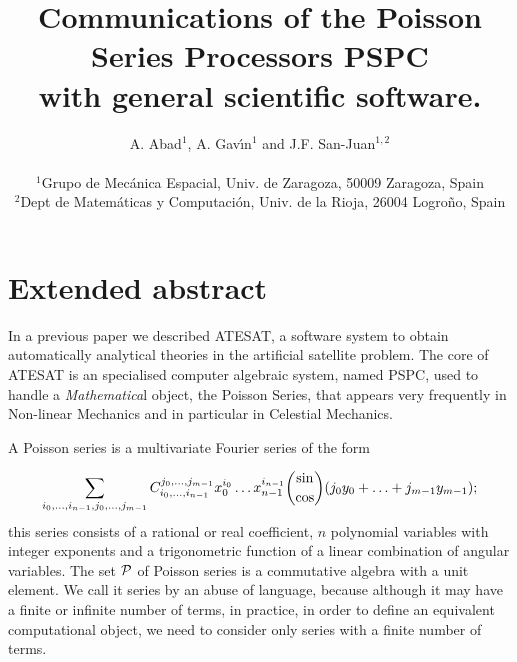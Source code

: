 %
%
\setlength{\textwidth}{14.0cm}
\setlength{\topmargin}{-1.0cm}
\setlength{\textheight}{21.0cm}

\title{\bf Communications of the Poisson Series Processors  PSPC  \\
with general scientific software. }
\author{
 A. Abad${}^1$, A. Gav\'{\i}n${}^1$ and J.F. San-Juan${}^{1,2}$ \\ [2ex] \\ 
  {\small ${}^{1}$Grupo de Mec\'anica Espacial, Univ. de Zaragoza, 50009 Zaragoza, Spain}
 \\
  {\small ${}^{2}$Dept de Matem\'aticas y Computaci\'on, Univ. de la Rioja, 26004 Logro\~no, Spain}
}
\date{}

\maketitle


\section*{Extended abstract}

In a previous paper \cite{aba98} we described ATESAT,
a software system to obtain automatically analytical theories in the artificial
satellite problem. The core of ATESAT is an specialised computer algebraic system,
named PSPC, used to handle a {\sl Mathematica}l object, the Poisson Series, that appears
very frequently in Non-linear Mechanics and in particular in Celestial Mechanics.
\par\medskip
A Poisson series is a multivariate Fourier series of the form

\[
 \sum_{i_0,\ldots,i_{n-1},j_0,\ldots,j_{m-1}}
 C_{i_0,\ldots,i_{n-1}}^{j_0,\ldots,j_{m-1}} x_0^{i_0} \ldots x_{n-1}^{i_{n-1}}
 \mbox{${\displaystyle {{\rm sin} \choose {\rm cos}}}$}
 (j_0y_0+\ldots+j_{m-1}y_{m-1});
 \]
\noindent this series consists of a rational
or real coefficient, $n$ polynomial variables with integer exponents and a
trigonometric function of a linear combination of angular variables.  The set
${\cal P}$ of Poisson series is a commutative algebra with a unit element. We
call it series by an abuse of language, because although it may have a finite or
infinite number of terms, in practice, in order to define an equivalent
computational object, we need to consider only series with a finite number of
terms.
\par\medskip

